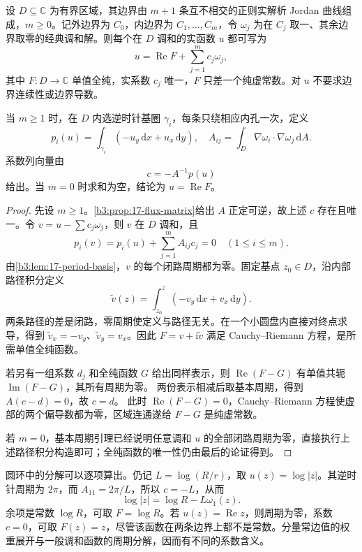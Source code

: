 \begin{proposition}[调和函数的周期分解]\label{b3:prop:17-period-decomposition}
设 \(D\subseteq\mathbb C\) 为有界区域，其边界由 \(m+1\) 条互不相交的正则实解析 Jordan 曲线组成，\(m\ge0\)。记外边界为 \(C_0\)，内边界为
\(C_1,\ldots,C_m\)，令 \(\omega_j\) 为在 \(C_j\) 取一、其余边界取零的经典调和解。则每个在 \(D\) 调和的实函数 \(u\) 都可写为
\[
 u=\operatorname{Re}F+\sum_{j=1}^m c_j\omega_j,
\]
其中 \(F:D\to\mathbb C\) 单值全纯，实系数 \(c_j\) 唯一，\(F\) 只差一个纯虚常数。对 \(u\) 不要求边界连续性或边界导数。

当 \(m\ge1\) 时，在 \(D\) 内选逆时针基圈 \(\gamma_i\)，每条只绕相应内孔一次，定义
\[
 p_i(u)=\int_{\gamma_i}(-u_y\,\mathrm dx+u_x\,\mathrm dy),
 \quad
 A_{ij}=\int_D\nabla\omega_i\cdot\nabla\omega_j\,\mathrm dA.
\]
系数列向量由
\[
 c=-A^{-1}p(u)
\]
给出。当 \(m=0\) 时求和为空，结论为 \(u=\operatorname{Re}F\)。
\end{proposition}
\begin{proof}
先设 \(m\ge1\)。\cref{b3:prop:17-flux-matrix}给出 \(A\) 正定可逆，故上述
\(c\) 存在且唯一。令 \(v=u-\sum c_j\omega_j\)，则 \(v\) 在 \(D\) 调和，且
\[
 p_i(v)=p_i(u)+\sum_{j=1}^mA_{ij}c_j=0
 \quad(1\le i\le m).
\]
由\cref{b3:lem:17-period-basis}，\(v\) 的每个闭路周期都为零。固定基点
\(z_0\in D\)，沿内部路径积分定义
\[
 \widetilde v(z)=\int_{z_0}^z(-v_y\,\mathrm dx+v_x\,\mathrm dy).
\]
两条路径的差是闭路，零周期使定义与路径无关。在一个小圆盘内直接对终点求导，得到
\(\widetilde v_x=-v_y\)、\(\widetilde v_y=v_x\)。因此
\(F=v+\mathrm i\widetilde v\) 满足 Cauchy--Riemann 方程，是所需单值全纯函数。

若另有一组系数 \(d_j\) 和全纯函数 \(G\) 给出同样表示，则
\(\operatorname{Re}(F-G)\) 有单值共轭 \(\operatorname{Im}(F-G)\)，其所有周期为零。
两份表示相减后取基本周期，得到 \(A(c-d)=0\)，故 \(c=d\)。
此时 \(\operatorname{Re}(F-G)=0\)，Cauchy--Riemann 方程使虚部的两个偏导数都为零，区域连通遂给 \(F-G\) 是纯虚常数。

若 \(m=0\)，基本周期引理已经说明任意调和 \(u\) 的全部闭路周期为零，直接执行上述路径积分构造即可；全纯函数的唯一性仍由最后的论证得到。
\end{proof}

圆环中的分解可以逐项算出。仍记 \(L=\log(R/r)\)，取
\(u(z)=\log|z|\)。其逆时针周期为 \(2\pi\)，而
\(A_{11}=2\pi/L\)，所以 \(c=-L\)，从而
\[
 \log|z|=\log R-L\omega_1(z).
\]
余项是常数 \(\log R\)，可取 \(F=\log R\)。若
\(u(z)=\operatorname{Re}z\)，则周期为零，系数 \(c=0\)，可取 \(F(z)=z\)，尽管该函数在两条边界上都不是常数。分量常边值的权重展开与一般调和函数的周期分解，因而有不同的系数含义。

